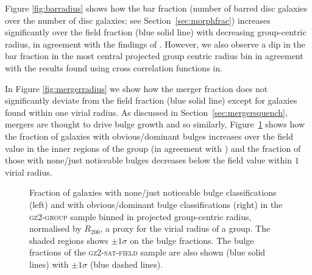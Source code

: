 \documentclass[useAMS,usenatbib]{mn2e}
\begin{document}
Figure \ref{fig:barradius} shows how the bar fraction (number of barred disc galaxies over the number of disc galaxies; see Section~\ref{sec:morphfrac}) increases significantly over the field fraction (blue solid line) with decreasing group-centric radius, in agreement with the findings of \cite{barazza09}. However, we also observe a dip in the bar fraction in the most central projected group centric radius bin in agreement with the results found using cross correlation functions in\cite{skibba12}. 

In Figure \ref{fig:mergerradius} we show how the merger fraction does not significantly deviate from the field fraction (blue solid line) except for galaxies found within one virial radius. As discussed in Section~\ref{sec:mergersquench}, mergers are thought to drive bulge growth and so similarly, Figure~\ref{fig:bulgeradius} shows how the fraction of galaxies with obvious/dominant bulges increases over the field value in the inner regions of the group (in agreement with \citealt{diaferio01}) and the fraction of those with none/just noticeable bulges decreases below the field value within $1$ virial radius. 

\begin{figure}
\caption[Bulge fraction with group radius in the \textsc{gz2-group} sample]{Fraction of galaxies with none/just noticeable bulge classifications (left) and with obvious/dominant bulge classifications (right) in the \textsc{gz2-group} sample binned in projected group-centric radius, normalised by $R_{200}$, a proxy for the virial radius of a group. The shaded regions shows $\pm1\sigma$ on the bulge fractions. The bulge fractions of the \textsc{gz2-sat-field} sample are also shown (blue solid lines) with $\pm1\sigma$ (blue dashed lines).}
\label{fig:bulgeradius}
\end{figure}
\end{document}
